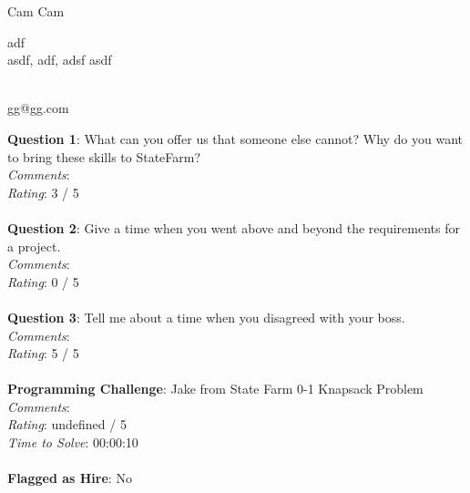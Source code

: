 \documentclass[12pt]{article}
\begin{document}
{\LARGE \begin{center}Cam Cam\end{center}}

\begin{multicols}{2}
\noindent
adf \\
asdf, adf, adsf asdf
\columnbreak

 \\
gg@gg.com
\end{multicols}

\noindent
\textbf{Question 1}: What can you offer us that someone else cannot? Why do you want to bring these skills to StateFarm?
\\\noindent
\textit{Comments}: 
\\\noindent
\textit{Rating}: 3 / 5
\\\\
\noindent
\textbf{Question 2}: Give a time when you went above and beyond the requirements for a project.
\\\noindent
\textit{Comments}: 
\\\noindent
\textit{Rating}: 0 / 5
\\\\
\noindent
\textbf{Question 3}: Tell me about a time when you disagreed with your boss.
\\\noindent
\textit{Comments}: 
\\\noindent
\textit{Rating}: 5 / 5
\\\\
\noindent
\textbf{Programming Challenge}: Jake from State Farm 0-1 Knapsack Problem
\\\noindent
\textit{Comments}: 
\\\noindent
\textit{Rating}: undefined / 5
\\\noindent
\textit{Time to Solve}: 00:00:10
\\\\
\textbf{Flagged as Hire}: No
\\\\ 
\end{document}

